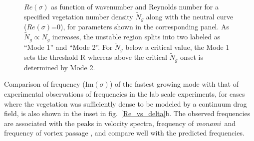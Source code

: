 \documentclass[aps,prl,twocolumn,superscriptaddress,10pt]{revtex4-1}  %
\newcommand{\Rey}{\text{R}}
\newcommand{\Ndg}{\tilde{N}_g}
\newcommand{\monami}{\textit{monami}}
\begin{document}
\begin{figure}
\begin{tabular}{cccc}
\end{tabular}
\caption{$Re(\sigma)$ as function of wavenumber and Reynolds number for a specified vegetation number density $\Ndg$ along with the neutral curve ($Re(\sigma)$=0), for parameters shown in the corresponding panel.  
As $\Ndg \propto N_g$ increases, the unstable region splits into two labeled as ``Mode 1'' and ``Mode 2''. 
For $\Ndg$ below a critical value, the Mode 1 sets the threshold $\Rey$ whereas above the critical $\Ndg$ onset is determined by Mode 2.}
\label{K_Re_sigma_set3}
\end{figure}

Comparison of frequency (Im$(\sigma)$) of the fastest growing mode with that of experimental observations of frequencies in
the lab scale experiments, for cases where the vegetation was sufficiently dense to be modeled by a continuum drag field, is also shown in the inset in fig.~\ref{Re_vs_delta}b. 
The observed frequencies are associated with the peaks in velocity spectra, frequency of \monami ~and frequency of 
vortex passage \cite{Ghisal02}, and compare well with the predicted frequencies. 
\end{document}
